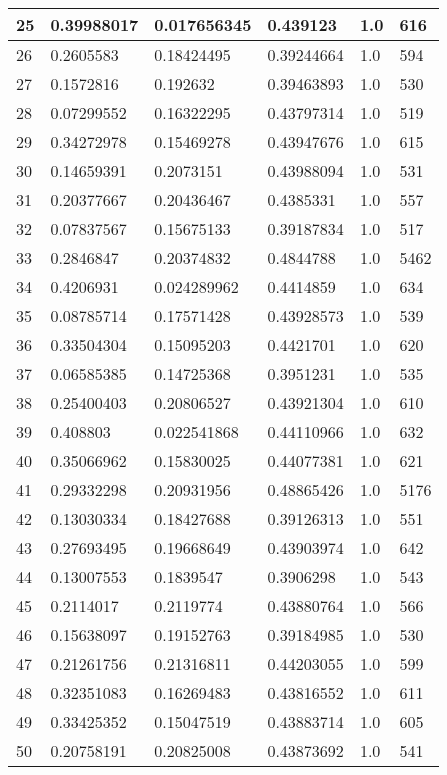 \begin{longtable}{|l|l|l|l|l|l|}
25 & 0.39988017 & 0.017656345 & 0.439123 & 1.0 & 616 \\ \hline 
26 & 0.2605583 & 0.18424495 & 0.39244664 & 1.0 & 594 \\ \hline 
27 & 0.1572816 & 0.192632 & 0.39463893 & 1.0 & 530 \\ \hline 
28 & 0.07299552 & 0.16322295 & 0.43797314 & 1.0 & 519 \\ \hline 
29 & 0.34272978 & 0.15469278 & 0.43947676 & 1.0 & 615 \\ \hline 
30 & 0.14659391 & 0.2073151 & 0.43988094 & 1.0 & 531 \\ \hline 
31 & 0.20377667 & 0.20436467 & 0.4385331 & 1.0 & 557 \\ \hline 
32 & 0.07837567 & 0.15675133 & 0.39187834 & 1.0 & 517 \\ \hline 
33 & 0.2846847 & 0.20374832 & 0.4844788 & 1.0 & 5462 \\ \hline 
34 & 0.4206931 & 0.024289962 & 0.4414859 & 1.0 & 634 \\ \hline 
35 & 0.08785714 & 0.17571428 & 0.43928573 & 1.0 & 539 \\ \hline 
36 & 0.33504304 & 0.15095203 & 0.4421701 & 1.0 & 620 \\ \hline 
37 & 0.06585385 & 0.14725368 & 0.3951231 & 1.0 & 535 \\ \hline 
38 & 0.25400403 & 0.20806527 & 0.43921304 & 1.0 & 610 \\ \hline 
39 & 0.408803 & 0.022541868 & 0.44110966 & 1.0 & 632 \\ \hline 
40 & 0.35066962 & 0.15830025 & 0.44077381 & 1.0 & 621 \\ \hline 
41 & 0.29332298 & 0.20931956 & 0.48865426 & 1.0 & 5176 \\ \hline 
42 & 0.13030334 & 0.18427688 & 0.39126313 & 1.0 & 551 \\ \hline 
43 & 0.27693495 & 0.19668649 & 0.43903974 & 1.0 & 642 \\ \hline 
44 & 0.13007553 & 0.1839547 & 0.3906298 & 1.0 & 543 \\ \hline 
45 & 0.2114017 & 0.2119774 & 0.43880764 & 1.0 & 566 \\ \hline 
46 & 0.15638097 & 0.19152763 & 0.39184985 & 1.0 & 530 \\ \hline 
47 & 0.21261756 & 0.21316811 & 0.44203055 & 1.0 & 599 \\ \hline 
48 & 0.32351083 & 0.16269483 & 0.43816552 & 1.0 & 611 \\ \hline 
49 & 0.33425352 & 0.15047519 & 0.43883714 & 1.0 & 605 \\ \hline 
50 & 0.20758191 & 0.20825008 & 0.43873692 & 1.0 & 541 \\ \hline 
\end{longtable}